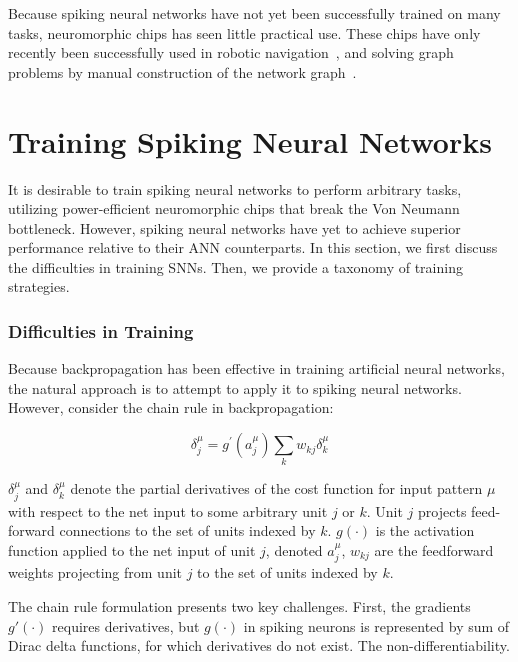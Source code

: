 \documentclass[fyp]{socreport}
\begin{document}
Because spiking neural networks have not yet been successfully trained on many
tasks, neuromorphic chips has seen little practical use. These chips have only
recently been successfully used in robotic navigation~\cite{SnnSlam}, and
solving graph problems by manual construction of the network
graph~\cite{Severa2016SpikingNA}.

\section{Training Spiking Neural Networks\label{sec:train-spik-neur}}

It is desirable to train spiking neural networks to perform arbitrary tasks,
utilizing power-efficient neuromorphic chips that break the Von Neumann
bottleneck. However, spiking neural networks have yet to achieve superior
performance relative to their ANN counterparts. In this section, we first
discuss the difficulties in training SNNs. Then, we provide a taxonomy of
training strategies.

\subsubsection{Difficulties in Training\label{sec:diff-train}}

Because backpropagation has been effective in training artificial neural
networks, the natural approach is to attempt to apply it to spiking neural
networks. However, consider the chain rule in backpropagation:

\begin{equation}
  \label{chainrule}
  \delta_{j}^{\mu}=g^{\prime}\left(a_{j}^{\mu}\right) \sum_{k} w_{k j} \delta_{k}^{\mu}
\end{equation}

\(\delta_{j}^{\mu}\) and \(\delta_{k}^{\mu}\) denote the partial derivatives of
the cost function for input pattern \(\mu\) with respect to the net input to
some arbitrary unit \(j\) or \(k\). Unit \(j\) projects feed-forward connections
to the set of units indexed by \(k\). \(g(\cdot)\) is the activation function
applied to the net input of unit \(j\), denoted \(a_j^{\mu}\), \(w_{kj}\) are
the feedforward weights projecting from unit \(j\) to the set of units indexed
by \(k\).

The chain rule formulation presents two key challenges. First, the gradients
\(g'(\cdot)\) requires derivatives, but \(g(\cdot)\) in spiking neurons is
represented by sum of Dirac delta functions, for which derivatives do not exist.
The non-differentiability.
\end{document}
